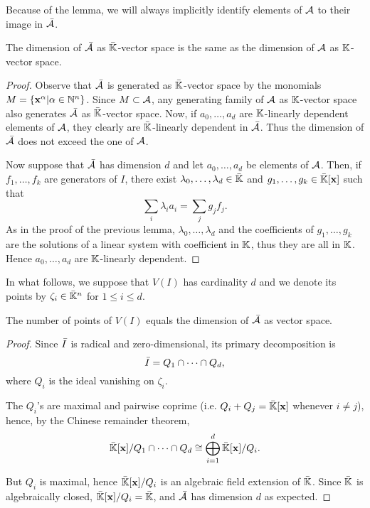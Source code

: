 Because of the lemma, we will always implicitly identify elements of
$\mathcal{A}$ to their image in $\bar{\mathcal{A}}$.

\begin{lemma}
  The dimension of $\bar{\mathcal{A}}$ as $\bar{\mathbb{K}}$-vector space is
  the same as the dimension of $\mathcal{A}$ as $\mathbb{K}$-vector space.
\end{lemma}
\begin{proof}
  Observe that $\bar{\mathcal{A}}$ is generated as $\bar{\mathbb{K}}$-vector
  space by the monomials $M=\{\mathbf{x}^\alpha|\alpha\in\mathbb{N}^n\}$. Since
  $M\subset\mathcal{A}$, any generating family of $\mathcal{A}$ as
  $\mathbb{K}$-vector space also generates $\bar{\mathcal{A}}$ as
  $\bar{\mathbb{K}}$-vector space.  Now, if $a_0,\ldots,a_d$ are
  $\mathbb{K}$-linearly dependent elements of $\mathcal{A}$, they clearly are
  $\bar{\mathbb{K}}$-linearly dependent in $\bar{\mathcal{A}}$. Thus the
  dimension of $\bar{\mathcal{A}}$ does not exceed the one of $\mathcal{A}$.

  Now suppose that $\bar{\mathcal{A}}$ has dimension $d$ and let
  $a_0,\ldots,a_d$ be elements of $\mathcal{A}$. Then, if
  $f_1,\ldots,f_k$ are generators of $I$, there exist
  $\lambda_0,\ldots,\lambda_d\in\bar{\mathbb{K}}$ and
  $g_1,\ldots,g_k\in\bar{\mathbb{K}}[\mathbf{x}]$ such that
  \begin{equation}
    \label{eq:115}
    \sum_i \lambda_ia_i = \sum_j g_jf_j
    \text{.}
  \end{equation}
  As in the proof of the previous lemma, $\lambda_0,\ldots,\lambda_d$
  and the coefficients of $g_1,\ldots,g_k$ are the solutions of a
  linear system with coefficient in $\mathbb{K}$, thus they are all in
  $\mathbb{K}$. Hence $a_0,\ldots,a_d$ are $\mathbb{K}$-linearly dependent.
\end{proof}


In what follows, we suppose that $V(I)$ has cardinality $d$ and we
denote its points by $\zeta_i\in\bar{\mathbb{K}}^n$ for $1\le i\le d$.

\begin{proposition}
  The number of points of $V(I)$ equals the dimension of
  $\bar{\mathcal{A}}$ as vector space.
\end{proposition}
\begin{proof}
  Since $\bar{I}$ is radical and zero-dimensional, its primary
  decomposition is
  \begin{equation}
    \label{eq:1}
    \bar{I}=Q_1\cap \cdots \cap Q_d
    \text{,}
  \end{equation}
  where $Q_i$ is the ideal vanishing on $\zeta_i$.
  
  The $Q_i$'s are maximal and pairwise coprime
  (i.e. $Q_i+Q_j=\bar{\mathbb{K}}[\mathbf{x}]$ whenever $i\ne j$), hence, by the
  Chinese remainder theorem,
  \begin{equation}
    \label{eq:3}
    \bar{\mathbb{K}}[\mathbf{x}]/Q_1\cap\cdots\cap Q_d \cong \bigoplus_{i=1}^d\bar{\mathbb{K}}[\mathbf{x}]/Q_i
    \text{.}
  \end{equation}

  But $Q_i$ is maximal, hence $\bar{\mathbb{K}}[\mathbf{x}]/Q_i$ is an algebraic
  field extension of $\bar{\mathbb{K}}$. Since $\bar{\mathbb{K}}$ is algebraically
  closed, $\bar{\mathbb{K}}[\mathbf{x}]/Q_i=\bar{\mathbb{K}}$, and $\bar{\mathcal{A}}$ has
  dimension $d$ as expected.
\end{proof}



